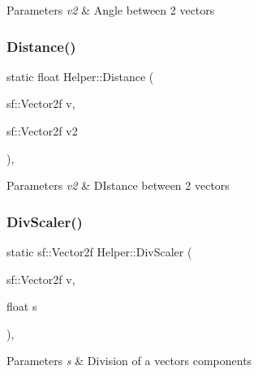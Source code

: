 \begin{DoxyParams}{Parameters}
{\em v2} & Angle between 2 vectors \\
\hline
\end{DoxyParams}
\mbox{\label{class_helper_aabf497b73c8aedbaf02b0f579ce73704}} 
\subsubsection{\texorpdfstring{Distance()}{Distance()}}
{\footnotesize\ttfamily static float Helper\+::\+Distance (\begin{DoxyParamCaption}\item[{sf\+::\+Vector2f}]{v,  }\item[{sf\+::\+Vector2f}]{v2 }\end{DoxyParamCaption})\hspace{0.3cm}{\ttfamily [inline]}, {\ttfamily [static]}}


\begin{DoxyParams}{Parameters}
{\em v2} & D\+Istance between 2 vectors \\
\hline
\end{DoxyParams}
\mbox{\label{class_helper_a1a431211d082593425ccfafe077dd5bc}} 
\subsubsection{\texorpdfstring{Div\+Scaler()}{DivScaler()}}
{\footnotesize\ttfamily static sf\+::\+Vector2f Helper\+::\+Div\+Scaler (\begin{DoxyParamCaption}\item[{sf\+::\+Vector2f}]{v,  }\item[{float}]{s }\end{DoxyParamCaption})\hspace{0.3cm}{\ttfamily [inline]}, {\ttfamily [static]}}


\begin{DoxyParams}{Parameters}
{\em s} & Division of a vectors components \\
\hline
\end{DoxyParams}
\mbox{\label{class_helper_a7a1497494599fe9b5bc68718c812d903}} 
